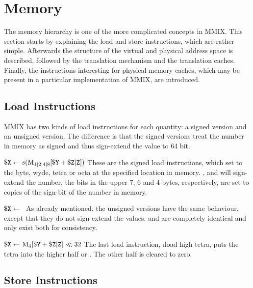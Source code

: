 \section{Memory}

The memory hierarchy is one of the more complicated concepts in MMIX. This section starts by explaining the load and store instructions, which are rather simple. Afterwards the structure of the virtual and physical address space is described, followed by the translation mechanism and the translation caches. Finally, the instructions interesting for physical memory caches, which may be present in a particular implementation of MMIX, are introduced.

\subsection{Load Instructions}

MMIX has two kinds of load instructions for each quantity: a signed version and an unsigned version. The difference is that the signed versions treat the number in memory as signed and thus sign-extend the value to 64 bit.

\instrtbl
	{}
	{$\dr{X} \leftarrow s(\vmem{1|2|4|8}{\dr{Y} + \udrim{Z}})$}
\noindent These are the signed load instructions, which set  to the byte, wyde, tetra or octa at the specified location in memory. ,  and  will sign-extend the number, \ie the bits in the upper 7, 6 and 4 bytes, respectively, are set to copies of the sign-bit of the number in memory. \citep[pg. 4]{mmix-doc}

\instrtbl
	{}
	{${\tt \$X} \leftarrow $~}
\noindent As already mentioned, the unsigned versions have the same behaviour, except that they do not sign-extend the values.  and  are completely identical and only exist both for consistency. \citep[pg. 4]{mmix-doc}

\instrtbl
	{}
	{$\dr{X} \leftarrow~\vmem{4}{\dr{Y} + \udrim{Z}}~\ll 32$}
\noindent The last load instruction, \i{load high tetra}, puts the tetra  into the higher half or . The other half is cleared to zero. \citep[pg. 4]{mmix-doc}

\subsection{Store Instructions}

